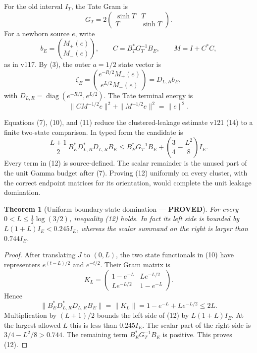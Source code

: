 \documentclass[11pt]{article}
\newcommand{\PROVED}{\textcolor{green!40!black}{\textbf{PROVED}}}
\newtheorem{theorem}{Theorem}
\begin{document}
For the old interval $I_T$, the Tate Gram is
\begin{equation}
 G_T=2\begin{pmatrix}\sinh T&T\\T&\sinh T\end{pmatrix}.       \tag{9}
\end{equation}
For a newborn source $e$, write
\[
 b_E=\binom{M_+(e)}{M_-(e)},\qquad
 C=B_T^*G_T^{-1}B_E,\qquad M=I+C^*C,
\]
as in v117.  By (3), the outer $a=1/2$ state vector is
\begin{equation}
 \zeta_E=
 \binom{e^{-R/2}M_+(e)}{e^{L/2}M_-(e)}
 =D_{L,R}b_E,                                               \tag{10}
\end{equation}
with $D_{L,R}=\operatorname{diag}(e^{-R/2},e^{L/2})$.
The Tate terminal energy is
\begin{equation}
 \|CM^{-1/2}e\|^2+\|M^{-1/2}e\|^2=\|e\|^2.                 \tag{11}
\end{equation}

Equations (7), (10), and (11) reduce the clustered-leakage estimate v121
(14) to a finite two-state comparison.  In typed form the candidate is
\begin{equation}
 \boxed{
 \frac{L+1}{2}\,
 B_E^*D_{L,R}^*D_{L,R}B_E
 \le B_E^*G_T^{-1}B_E
   +\left(\frac34-\frac{L^2}{8}\right)I_E.}                  \tag{12}
\end{equation}
Every term in (12) is source-defined.  The scalar remainder is the unused
part of the unit Gamma budget after (7).  Proving (12) uniformly on every
cluster, with the correct endpoint matrices for its orientation, would
complete the unit leakage domination.

\begin{theorem}[Uniform boundary-state domination --- \PROVED]
For every $0<L\le\frac12\log(3/2)$, inequality (12) holds.  In fact its
left side is bounded by $L(1+L)I_E<0.245I_E$, whereas the scalar summand
on the right is larger than $0.744I_E$.
\end{theorem}

\begin{proof}
After translating $J$ to $(0,L)$, the two state functionals in (10) have
representers $e^{(t-L)/2}$ and $e^{-t/2}$.  Their Gram matrix is
\[
 K_L=\begin{pmatrix}
 1-e^{-L}&Le^{-L/2}\\
 Le^{-L/2}&1-e^{-L}
 \end{pmatrix}.
\]
Hence
\[
 \|B_E^*D_{L,R}^*D_{L,R}B_E\|
 =\|K_L\|
 =1-e^{-L}+Le^{-L/2}\le2L.
\]
Multiplication by $(L+1)/2$ bounds the left side of (12) by
$L(1+L)I_E$.  At the largest allowed $L$ this is less than $0.245I_E$.
The scalar part of the right side is
$3/4-L^2/8>0.744$.  The remaining term
$B_E^*G_T^{-1}B_E$ is positive.  This proves (12).
\end{proof}
\end{document}
